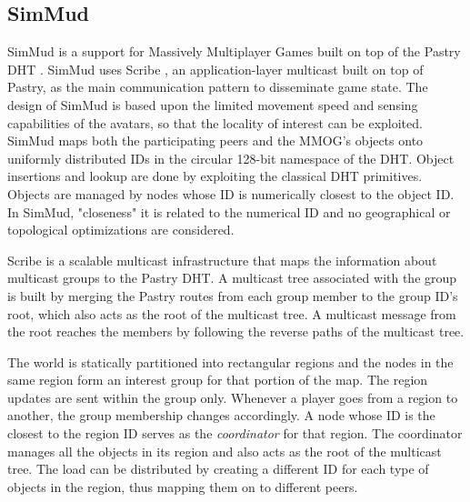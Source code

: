 \documentclass[final,10pt,a5paper]{phdimt}
\theoremstyle{definition}
\begin{document}
\subsection{SimMud}
SimMud \cite{Knutsson2004} is a support for Massively Multiplayer Games built on top of the Pastry DHT \cite{rowstron2001pastry}. SimMud uses Scribe \cite{Castro2002}, an application-layer multicast built on top of Pastry, as the main communication pattern to disseminate game state. The design of SimMud is based upon the limited movement speed and sensing capabilities of the avatars, so that the locality of interest can be exploited. SimMud maps both the participating peers and the MMOG's objects onto uniformly distributed IDs in the circular 128-bit namespace of the DHT. Object insertions and lookup are done by exploiting the classical DHT primitives.
Objects are managed by nodes whose ID is numerically closest to the object ID. In SimMud, "closeness" it is related to the numerical ID and no geographical or topological optimizations are considered.

Scribe is a scalable multicast infrastructure that maps the information about multicast groups to the Pastry DHT. A multicast tree associated with the group is built by merging the Pastry routes from each group member to the group ID's root, which also acts as the root of the multicast tree. A multicast message from the root reaches the members by following the reverse paths of the multicast tree.




The world is statically partitioned into rectangular regions and the nodes in the same region form an interest group for that portion of the map. The region updates are sent within the group only. Whenever a player goes from a region to another, the group membership changes accordingly. 
A node whose ID is the closest to the region ID serves as the \emph{coordinator} for that region. The coordinator manages all the objects in its region and also acts as the root of the multicast tree. The load can be distributed by creating a different ID for each type of objects in the region, thus mapping them on to different peers.
     
\end{document}
